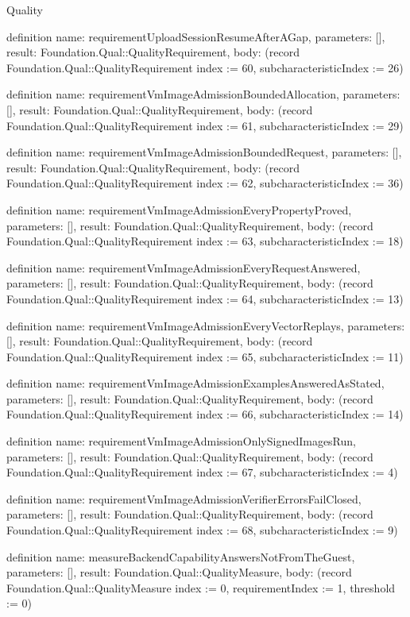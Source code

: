 \begin{lexlean}{Quality}
\begin{semanticmodule}
definition{
  name: requirementUploadSessionResumeAfterAGap,
  parameters: [],
  result: Foundation.Qual::QualityRequirement,
  body: (record Foundation.Qual::QualityRequirement {index := 60, subcharacteristicIndex := 26})
}

definition{
  name: requirementVmImageAdmissionBoundedAllocation,
  parameters: [],
  result: Foundation.Qual::QualityRequirement,
  body: (record Foundation.Qual::QualityRequirement {index := 61, subcharacteristicIndex := 29})
}

definition{
  name: requirementVmImageAdmissionBoundedRequest,
  parameters: [],
  result: Foundation.Qual::QualityRequirement,
  body: (record Foundation.Qual::QualityRequirement {index := 62, subcharacteristicIndex := 36})
}

definition{
  name: requirementVmImageAdmissionEveryPropertyProved,
  parameters: [],
  result: Foundation.Qual::QualityRequirement,
  body: (record Foundation.Qual::QualityRequirement {index := 63, subcharacteristicIndex := 18})
}

definition{
  name: requirementVmImageAdmissionEveryRequestAnswered,
  parameters: [],
  result: Foundation.Qual::QualityRequirement,
  body: (record Foundation.Qual::QualityRequirement {index := 64, subcharacteristicIndex := 13})
}

definition{
  name: requirementVmImageAdmissionEveryVectorReplays,
  parameters: [],
  result: Foundation.Qual::QualityRequirement,
  body: (record Foundation.Qual::QualityRequirement {index := 65, subcharacteristicIndex := 11})
}

definition{
  name: requirementVmImageAdmissionExamplesAnsweredAsStated,
  parameters: [],
  result: Foundation.Qual::QualityRequirement,
  body: (record Foundation.Qual::QualityRequirement {index := 66, subcharacteristicIndex := 14})
}

definition{
  name: requirementVmImageAdmissionOnlySignedImagesRun,
  parameters: [],
  result: Foundation.Qual::QualityRequirement,
  body: (record Foundation.Qual::QualityRequirement {index := 67, subcharacteristicIndex := 4})
}

definition{
  name: requirementVmImageAdmissionVerifierErrorsFailClosed,
  parameters: [],
  result: Foundation.Qual::QualityRequirement,
  body: (record Foundation.Qual::QualityRequirement {index := 68, subcharacteristicIndex := 9})
}

definition{
  name: measureBackendCapabilityAnswersNotFromTheGuest,
  parameters: [],
  result: Foundation.Qual::QualityMeasure,
  body: (record Foundation.Qual::QualityMeasure {index := 0, requirementIndex := 1, threshold := 0})
}


\end{semanticmodule}
\end{lexlean}
